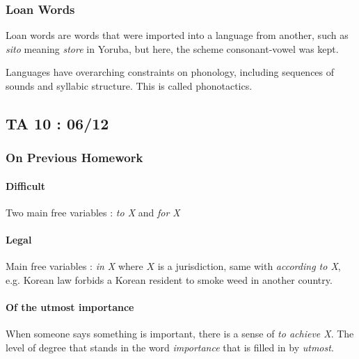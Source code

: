 \documentclass{cours}
\begin{document}
\subsubsection{Loan Words}
Loan words are words that were imported into a language from another, such as \textsl{sito} meaning \textsl{store} in Yoruba, but here, the scheme consonant-vowel was kept.

Languages have overarching constraints on phonology, including sequences of sounds and syllabic structure. This is called phonotactics.


\subsection{TA 10\! : 06/12}
\subsubsection{On Previous Homework}
\paragraph{Difficult}
Two main free variables\! : \textit{to X} and \textit{for X}

\paragraph{Legal}
Main free variables\! : \textit{in X} where $X$ is a jurisdiction, same with \textit{according to X}, e.g. Korean law forbids a Korean resident to smoke weed in another country.

\paragraph{Of the utmost importance}
When someone says something is important, there is a sense of \textit{to achieve X}. The level of degree that stands in the word \textit{importance} that is filled in by \textit{utmost}.
\end{document}
